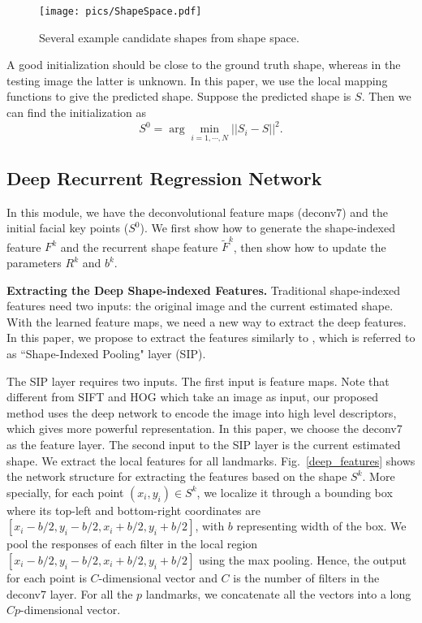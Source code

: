 \documentclass[journal]{IEEEtran}
\begin{document}
\begin{figure}[h]
    \texttt{[image: pics/ShapeSpace.pdf]}
  \caption{Several example candidate shapes from shape space.}
  \label{shapes}  %
\end{figure}

A good initialization should be close to the ground truth shape, whereas in the testing image the latter is unknown. In this paper, we use the local mapping functions to give the predicted shape.  Suppose the predicted shape is $S$. Then we can find the initialization as
\begin{equation}
S^0 = \arg \min_{i=1,\cdots,N} ||S_i - S||^2.
\end{equation}


\subsection{Deep Recurrent Regression Network} \label{drrn}
In this module, we have the deconvolutional feature maps (deconv7) and the initial facial key points ($S^0$). We first show how to generate the shape-indexed feature $F^k$ and the recurrent shape feature $\widetilde{F}^{k}$, then show how to update the parameters $R^k$ and $b^k$.

\textbf{Extracting the Deep Shape-indexed Features.} Traditional shape-indexed features need two inputs: the original image and the current estimated shape. With the learned feature maps, we need a new way to extract the deep features. In this paper, we propose to extract the features similarly to \cite{spp}, which is referred to as ``Shape-Indexed Pooling" layer (SIP).

The SIP layer requires two inputs. The first input is feature maps. Note that different from SIFT and HOG which take an image as input, our proposed method uses the deep network to encode the image into high level descriptors, which gives more powerful representation. In this paper, we choose the deconv7 as the feature layer. The second input to the SIP layer is the current estimated shape. We extract the local features for all landmarks. Fig.~\ref{deep_features} shows the network structure for extracting the features based on the shape $S^k$. More specially, for each point $(x_i,y_i) \in S^k$, we localize it through a bounding box where its top-left and bottom-right coordinates are  $[x_i-b/2,y_i-b/2, x_i+b/2, y_i+b/2 ]$, with $b$ representing width of the box. We pool the responses of each filter in the local region  $[ x_i-b/2,y_i-b/2, x_i+b/2, y_i+b/2 ]$ using the max pooling. Hence, the output for each point is $C$-dimensional vector and $C$ is the number of filters in the deconv7 layer. For all the $p$ landmarks, we concatenate all the vectors into a long $Cp$-dimensional vector.
\end{document}
